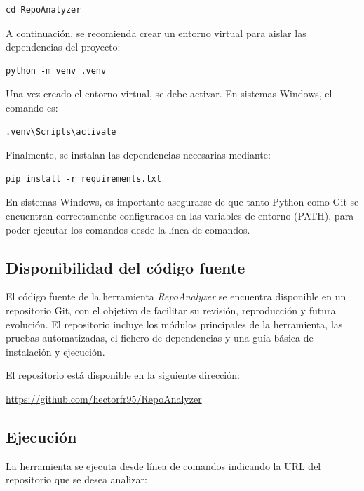 \documentclass[a4paper, 12pt]{book}
\begin{document}
\begin{verbatim}
cd RepoAnalyzer
\end{verbatim}

A continuación, se recomienda crear un entorno virtual para aislar las dependencias del proyecto:

\begin{verbatim}
python -m venv .venv
\end{verbatim}

Una vez creado el entorno virtual, se debe activar. En sistemas Windows, el comando es:

\begin{verbatim}
.venv\Scripts\activate
\end{verbatim}

Finalmente, se instalan las dependencias necesarias mediante:

\begin{verbatim}
pip install -r requirements.txt
\end{verbatim}

En sistemas Windows, es importante asegurarse de que tanto Python como Git se encuentran correctamente configurados en las variables de entorno (PATH), para poder ejecutar los comandos desde la línea de comandos.

\subsection{Disponibilidad del código fuente}
\label{subsec:codigo_fuente}

El código fuente de la herramienta \emph{RepoAnalyzer} se encuentra disponible en un repositorio Git, con el objetivo de facilitar su revisión, reproducción y futura evolución. El repositorio incluye los módulos principales de la herramienta, las pruebas automatizadas, el fichero de dependencias y una guía básica de instalación y ejecución.

El repositorio está disponible en la siguiente dirección:

\begin{center}
\url{https://github.com/hectorfr95/RepoAnalyzer}
\end{center}

\subsection{Ejecución}
\label{subsec:ejecucion_manual}

La herramienta se ejecuta desde línea de comandos indicando la URL del repositorio que se desea analizar:
\end{document}

